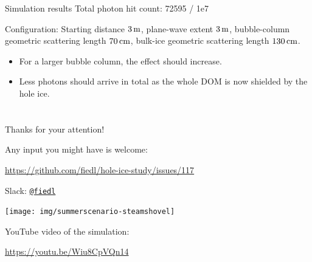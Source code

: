\begin{frame}[fragile]{Simulation results}
  \tiny Total photon hit count: 72595 / 1e7

  \tiny Configuration: Starting distance $3\text{\,m}$, plane-wave extent $3\text{\,m}$, bubble-column geometric scattering length $70\text{\,cm}$, bulk-ice geometric scattering length $130\text{\,cm}$.
  \normalsize

  \begin{itemize}
    \item For a larger bubble column, the effect should increase. \checkmark
    \item Less photons should arrive in total \tiny as the whole DOM is now shielded by the hole ice. \normalsize \checkmark
  \end{itemize}
\end{frame}


\section{}
\begin{frame}[fragile]{Thanks for your attention!}
  \begin{center}
  Any input you might have is welcome: \\ \vspace{0.3cm}

  \url{https://github.com/fiedl/hole-ice-study/issues/117} \\ \vspace{0.1cm}

  Slack:
  \href{https://icecube-spno.slack.com/messages/@U092MBFU2}{\texttt{@fiedl}}

  \vspace{1.5cm}

  \texttt{[image: img/summerscenario-steamshovel]}

  YouTube video of the simulation:

  \url{https://youtu.be/Wiu8CpVQn14}

  \end{center}
\end{frame}